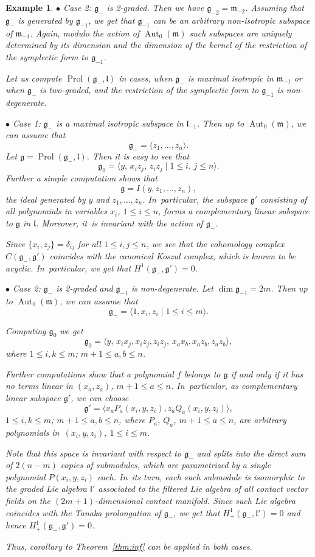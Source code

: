 \documentclass[pdftex]{sigma}%
\newcommand{\g}{\mathfrak g}
\newcommand{\lf}{\mathfrak l}
\newcommand{\m}{\mathfrak m}
\newcommand{\Aut}{\operatorname{Aut}}
\newcommand{\Prol}{\operatorname{Prol}}
\newtheorem{ex}[thm]{Example}
\numberwithin{equation}{section}
\begin{document}
\begin{ex}
$\bullet$ {\it Case} 2: $\g_{-}$ is 2-graded. Then we have $\g_{-2}=\m_{-2}$. Assuming that $\g_-$ is generated by $\g_{-1}$, we get that $\g_{-1}$ can be an arbitrary non-isotropic subspace of $\m_{-1}$. Again, modulo the action of $\Aut_0(\m)$ such subspaces are uniquely determined by its dimension and the dimension of the kernel of the restriction of the symplectic form to $\g_{-1}$.
	
	Let us compute $\Prol(\g_{-}, \lf)$ in cases, when $\g_{-}$ is maximal isotropic in $\m_{-1}$ or when $\g_{-}$ is two-graded, and the restriction of the symplectic form to $\g_{-1}$ is non-degenerate.
	
$\bullet$ {\it Case} 1: $\g_{-}$ is a maximal isotropic subspace in $\lf_{-1}$. Then up to $\Aut_0(\m)$, we can assume that
	\[
	\g_{-} = \langle z_1,\dots, z_n\rangle.
	\]
	Let $\g=\Prol(\g_{-},\lf)$. Then it is easy to see that
	\[
	\g_0 = \langle y,\, x_iz_j,\, z_iz_j \mid 1\le i,\,j\le n\rangle.
	\]
	Further a simple computation shows that
	\[
	\g = I(y,z_1,\dots,z_n),
	\]
	the ideal generated by $y$ and $z_1,\dots,z_n$. In~particular, the subspace $\g'$ consisting of all polynomials in variables $x_i$, $1\le i \le n$, forms a complementary linear subspace to $\g$ in $\lf$. Moreover, it~is invariant with the action of $\g_{-}$.
	
	Since $\{x_i,z_j\} = \delta_{ij}$ for all $1\le i,j\le n$, we see that the cohomology complex $C(\g_{-},\g')$ coincides with the \emph{canonical Koszul complex}, which is known to be acyclic. In~particular, we get that $H^1(\g_{-},\g')=0$.
	
$\bullet$ {\it Case} 2: $\g_{-}$ is 2-graded and $\g_{-1}$ is non-degenerate. Let $\dim \g_{-1} = 2m$. Then up to $\Aut_0(\m)$, we can assume that
	\[
	\g_{-} = \langle 1, x_i,z_i \mid 1\le i \le m \rangle.
	\]
	
	Computing $\g_0$ we get
	\[
	\g_0 = \langle y,\, x_ix_j, x_iz_j, z_iz_j,\, x_ax_b, x_az_b, z_az_b \rangle,
	\]
	where $1\le i,k\le m$; $m+1\le a,b\le n$.
	
	Further computations show that a polynomial $f$ belongs to $\g$ if and only if it has no terms linear in $(x_a,z_a)$, $m+1\le a\le n$. In~particular, as complementary linear subspace $\g'$, we can choose
	\[
	\g'= \big\langle x_a P_a(x_i,y,z_i), z_a Q_a(x_i,y,z_i) \big\rangle,
	\]
	$1\le i,k\le m$; $m+1\le a,b\le n$, where $P_a$, $Q_a$, $m+1\le a\le n$, are arbitrary polynomials in~$(x_i,y,z_i)$, $1\le i\le m$.
	
	Note that this space is invariant with respect to $\g_{-}$ and splits into the direct sum of $2(n-m)$ copies of submodules, which are parametrized by a single polynomial $P(x_i,y,z_i)$ each. In~its turn, each such submodule is isomorphic to the graded Lie algebra $\lf'$ associated to the filtered Lie algebra of all contact vector fields on the $(2m+1)$-dimensional contact manifold. Since such Lie algebra coincides with the Tanaka prolongation of $\g_{-}$, we get that $H^1_{+}(\g_{-},\lf')=0$ and hence $H^1_{+}(\g_{-},\g')=0$.
	
	Thus, corollary to Theorem~\ref{thm:inf} can be applied in both cases.
\end{ex}
\end{document}
